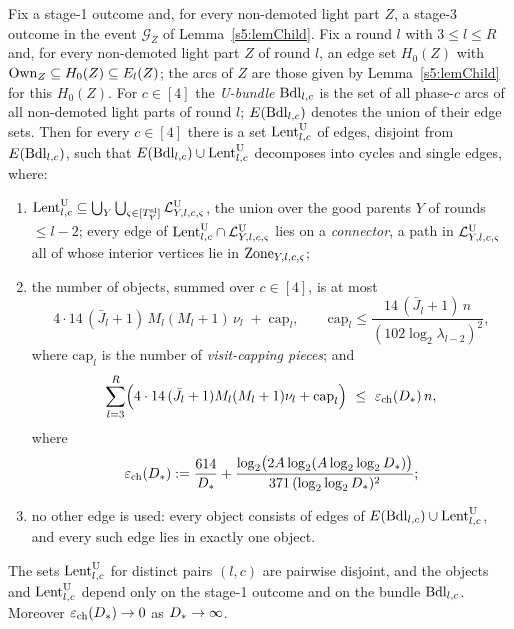 \begin{lemma}\label{s5:lemParent}
Fix a stage-1 outcome and, for every non-demoted light part $Z$, a stage-3 outcome in the event $\mathcal G_Z$ of Lemma~\ref{s5:lemChild}. Fix a round $l$ with $3\le l\le R$ and, for every non-demoted light part $Z$ of round $l$, an edge set $H_0(Z)$ with $\mathrm{Own}_Z\subseteq H_0(Z)\subseteq E_l(Z)$; the arcs of $Z$ are those given by Lemma~\ref{s5:lemChild} for this $H_0(Z)$. For $c\in[4]$ the \emph{U-bundle} $\mathrm{Bdl}_{l,c}$ is the set of all phase-$c$ arcs of all non-demoted light parts of round $l$; $E(\mathrm{Bdl}_{l,c})$ denotes the union of their edge sets. Then for every $c\in[4]$ there is a set $\mathrm{Lent}^{\mathrm{U}}_{l,c}$ of edges, disjoint from $E(\mathrm{Bdl}_{l,c})$, such that $E(\mathrm{Bdl}_{l,c})\cup\mathrm{Lent}^{\mathrm{U}}_{l,c}$ decomposes into cycles and single edges, where:
\begin{enumerate}
\item[(i)] $\mathrm{Lent}^{\mathrm{U}}_{l,c}\subseteq\bigcup_Y\bigcup_{\varsigma\in[T^{\mathrm{sl}}_Y]}\mathcal{L}^{\mathrm{U}}_{Y,l,c,\varsigma}$, the union over the good parents $Y$ of rounds $\le l-2$; every edge of $\mathrm{Lent}^{\mathrm{U}}_{l,c}\cap\mathcal{L}^{\mathrm{U}}_{Y,l,c,\varsigma}$ lies on a \emph{connector}, a path in $\mathcal{L}^{\mathrm{U}}_{Y,l,c,\varsigma}$ all of whose interior vertices lie in $\mathrm{Zone}_{Y,l,c,\varsigma}$;
\item[(ii)] the number of objects, summed over $c\in[4]$, is at most
\[
4\cdot14\,(\bar J_l+1)\,M_l(M_l+1)\,\nu_l\;+\;\mathrm{cap}_l,\qquad \mathrm{cap}_l\le\frac{14\,(\bar J_l+1)\,n}{(102\log_2\lambda_{l-2})^2},
\]
where $\mathrm{cap}_l$ is the number of \emph{visit-capping pieces}; and
\[
\sum_{l=3}^{R}\Bigl(4\cdot14\,(\bar J_l+1)M_l(M_l+1)\nu_l+\mathrm{cap}_l\Bigr)\ \le\ \epsChain(\Dstar)\,n,
\]
where
\[
\varepsilon_{\mathrm{ch}}(D_{*})\mathrel{:=}\frac{614}{D_{*}}+\frac{\log_2\bigl(2A\log_2(A\log_2\log_2D_{*})\bigr)}{371\,(\log_2\log_2D_{*})^2};
\]
\item[(iii)] no other edge is used: every object consists of edges of $E(\mathrm{Bdl}_{l,c})\cup\mathrm{Lent}^{\mathrm{U}}_{l,c}$, and every such edge lies in exactly one object.
\end{enumerate}
The sets $\mathrm{Lent}^{\mathrm{U}}_{l,c}$ for distinct pairs $(l,c)$ are pairwise disjoint, and the objects and $\mathrm{Lent}^{\mathrm{U}}_{l,c}$ depend only on the stage-1 outcome and on the bundle $\mathrm{Bdl}_{l,c}$. Moreover $\varepsilon_{\mathrm{ch}}(D_{*})\to0$ as $D_{*}\to\infty$.
\deps{\ref{s5:lemChild}, \ref{s5:defStages}, \ref{s5:lemZones}, \ref{s3:defCOL}, \ref{s3:lemCOLJV}, \ref{s3:lemMonotone}, \ref{s1:citEuler}, \ref{s2:propOV}, \ref{s2:lemTower}, \ref{s2:propStructure}, \ref{s1:condG1}, \ref{s1:citDef7}}
\end{lemma}

